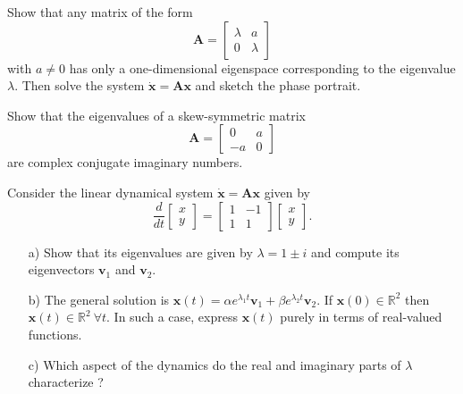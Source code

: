 \begin{problem}
  Show that any matrix of the form
  \[
  \bm{A} = \begin{bmatrix} \lambda & a \\ 0 & \lambda \end{bmatrix}
  \]
  with $a \neq 0$ has only a one-dimensional eigenspace corresponding to the eigenvalue $\lambda$.
  Then solve the system $\dot{\bm{x}} = \bm{Ax}$ and sketch the phase portrait.
\end{problem}

\bigskip

\begin{problem}
  Show that the eigenvalues of a skew-symmetric matrix
  \[
  \bm{A} = \begin{bmatrix} 0 & a \\ -a & 0 \end{bmatrix}
  \]
  are complex conjugate imaginary numbers.
\end{problem}

\bigskip

\begin{problem}
  Consider the linear dynamical system $\dot{\bm{x}} = \bm{Ax}$ given by
  \[
  \dfrac{d}{dt} \begin{bmatrix} x \\ y \end{bmatrix}
  =
  \begin{bmatrix}
    1 & -1 \\ 1 & 1
  \end{bmatrix}
  \begin{bmatrix}
    x \\ y
  \end{bmatrix}.
  \]

  \begin{enumerate}
  \item[a)] Show that its eigenvalues are given by $\lambda = 1 \pm i$ and compute its eigenvectors $\bm{v}_1$ and $\bm{v}_2$.

  \item[b)] The general solution is $\bm{x}(t) = \alpha e^{\lambda_1 t} \bm{v}_1 + \beta e^{\lambda_2t} \bm{v}_2$.
    If $\bm{x}(0) \in \mathbb{R}^2$ then $\bm{x}(t) \in \mathbb{R}^2 \ \forall t$.
    In such a case, express $\bm{x}(t)$ purely in terms of real-valued functions.

  \item[c)] Which aspect of the dynamics do the real and imaginary parts of $\lambda$ characterize ?
  \end{enumerate}
\end{problem}

